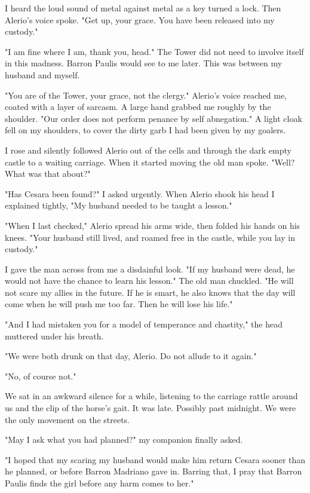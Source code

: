 \documentclass{article}
\begin{document}
I heard the loud sound of metal against metal as a key turned a lock. Then Alerio's voice spoke. "Get up, your grace. You have been released into my custody."

"I am fine where I am, thank you, head." The Tower did not need to involve itself in this madness. Barron Paulis would see to me later. This was between my husband and myself.

"You are of the Tower, your grace, not the clergy." Alerio's voice reached me, coated with a layer of sarcasm. A large hand grabbed me roughly by the shoulder. "Our order does not perform penance by self abnegation." A light cloak fell on my shoulders, to cover the dirty garb I had been given by my goalers.

I rose and silently followed Alerio out of the cells and through the dark empty castle to a waiting carriage. When it started moving the old man spoke. "Well? What was that about?"

"Has Cesara been found?" I asked urgently. When Alerio shook his head I explained tightly, "My husband needed to be taught a lesson."

"When I last checked," Alerio spread his arms wide, then folded his hands on his knees. "Your husband still lived, and roamed free in the castle, while you lay in custody."

I gave the man across from me a disdainful look. "If my husband were dead, he would not have the chance to learn his lesson." The old man chuckled. "He will not scare my allies in the future. If he is smart, he also knows that the day will come when he will push me too far. Then he will lose his life."

"And I had mistaken you for a model of temperance and chastity," the head muttered under his breath.

"We were both drunk on that day, Alerio. Do not allude to it again."

"No, of course not."

We sat in an awkward silence for a while, listening to the carriage rattle around us and the clip of the horse's gait. It was late. Possibly past midnight. We were the only movement on the streets. 

"May I ask what you had planned?" my companion finally asked. 

"I hoped that my scaring my husband would make him return Cesara sooner than he planned, or before Barron Madriano gave in. Barring that, I pray that Barron Paulis finds the girl before any harm comes to her."
\end{document}

